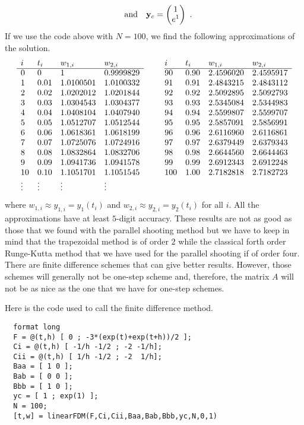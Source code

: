 \begin{egg}
\begin{align*}
\quad \text{and}
\quad \mathbf{y}_c = \begin{pmatrix} 1 \\ e^1 \end{pmatrix} \ .
\end{align*}
If we use the code above with $N=100$, we find the following approximations of
the solution.
\[
\begin{array}{llllc@{\hspace{2em}}llll}
i & t_i & w_{1,i} & w_{2,i} & & i & t_i & w_{1,i} & w_{2,i} \\
\cline{1-4} \cline{6-9}
0 & 0 & 1 & 0.9999829 && 90 & 0.90 & 2.4596020 & 2.4595917 \\
1 & 0.01 & 1.0100501 & 1.0100332 && 91 & 0.91 & 2.4843215 & 2.4843112 \\
2 & 0.02 & 1.0202012 & 1.0201844 && 92 & 0.92 & 2.5092895 & 2.5092793 \\
3 & 0.03 & 1.0304543 & 1.0304377 && 93 & 0.93 & 2.5345084 & 2.5344983 \\
4 & 0.04 & 1.0408104 & 1.0407940 && 94 & 0.94 & 2.5599807 & 2.5599707 \\
5 & 0.05 & 1.0512707 & 1.0512544 && 95 & 0.95 & 2.5857091 & 2.5856991 \\
6 & 0.06 & 1.0618361 & 1.0618199 && 96 & 0.96 & 2.6116960 & 2.6116861 \\
7 & 0.07 & 1.0725076 & 1.0724916 && 97 & 0.97 & 2.6379449 & 2.6379343 \\
8 & 0.08 & 1.0832864 & 1.0832706 && 98 & 0.98 & 2.6644560 & 2.6644463 \\
9 & 0.09 & 1.0941736 & 1.0941578 && 99 & 0.99 & 2.6912343 & 2.6912248 \\
10 & 0.10 & 1.1051701 & 1.1051545 && 100 & 1.00 & 2.7182818 & 2.7182723 \\
\vdots & \vdots & \vdots & \vdots && & & & \\
\end{array}
\]
where $w_{1,i} \approx y_{1,i} = y_1(t_i)$ and
$w_{2,i} \approx y_{2,i} = y_2(t_i)$ for all $i$.
All the approximations have at least $5$-digit accuracy.  These results
are not as good as those that we found with the parallel
shooting method but we have to keep in mind that the trapezoidal
method is of order $2$ while the classical forth order Runge-Kutta
method that we have used for the parallel shooting if of order four.
There are finite difference schemes that can give better results.
However, those schemes will generally not be one-step scheme and,
therefore, the matrix $A$ will not be as nice as the one that we have
for one-step schemes.

Here is the code used to call the finite difference method.
\begin{code}
\small
\begin{verbatim}
  format long
  F = @(t,h) [ 0 ; -3*(exp(t)+exp(t+h))/2 ];
  Ci = @(t,h) [ -1/h -1/2 ; -2 -1/h];
  Cii = @(t,h) [ 1/h -1/2 ; -2  1/h];
  Baa = [ 1 0 ];
  Bab = [ 0 0 ];
  Bbb = [ 1 0 ];
  yc = [ 1 ; exp(1) ];
  N = 100;
  [t,w] = linearFDM(F,Ci,Cii,Baa,Bab,Bbb,yc,N,0,1)
\end{verbatim}
\end{code}
\end{egg}

